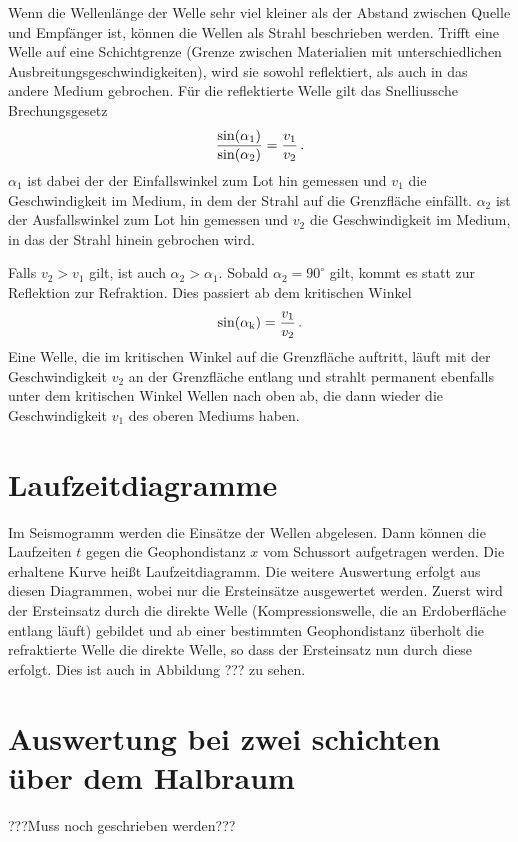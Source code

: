 Wenn die Wellenlänge der Welle sehr viel kleiner als der Abstand zwischen Quelle und Empfänger ist, können die Wellen als Strahl beschrieben werden. Trifft eine Welle auf eine Schichtgrenze (Grenze zwischen Materialien mit unterschiedlichen Ausbreitungsgeschwindigkeiten), wird sie sowohl reflektiert, als auch in das andere Medium gebrochen. Für die reflektierte Welle gilt das Snelliussche Brechungsgesetz
\begin{equation}
 \frac{\sin(\alpha_1)}{\sin(\alpha_2)}=\frac{v_1}{v_2}\text{\,.}
\end{equation}
$\alpha_1$ ist dabei der der Einfallswinkel zum Lot hin gemessen und $v_1$ die Geschwindigkeit im Medium, in dem der Strahl auf die Grenzfläche einfällt. $\alpha_2$ ist der Ausfallswinkel zum Lot hin gemessen und $v_2$ die Geschwindigkeit im Medium, in das der Strahl hinein gebrochen wird.

Falls $v_2>v_1$ gilt, ist auch $\alpha_2>\alpha_1$. Sobald $\alpha_2=90^\circ$ gilt, kommt es statt zur Reflektion zur Refraktion. Dies passiert ab dem kritischen Winkel
\begin{equation}
 \sin(\alpha_{\mathrm{k}}) =\frac{v_1}{v_2} \text{\,.}
\end{equation}
Eine Welle, die im kritischen Winkel auf die Grenzfläche auftritt, läuft mit der Geschwindigkeit $v_2$ an der Grenzfläche entlang und strahlt permanent ebenfalls unter dem kritischen Winkel Wellen nach oben ab, die dann wieder die Geschwindigkeit $v_1$ des oberen Mediums haben.

\section{Laufzeitdiagramme}

Im Seismogramm werden die Einsätze der Wellen abgelesen. Dann können die Laufzeiten $t$ gegen die Geophondistanz $x$ vom Schussort aufgetragen werden. Die erhaltene Kurve heißt Laufzeitdiagramm. Die weitere Auswertung erfolgt aus diesen Diagrammen, wobei nur die Ersteinsätze ausgewertet werden. Zuerst wird der Ersteinsatz durch die direkte Welle (Kompressionswelle, die an Erdoberfläche entlang läuft) gebildet und ab einer bestimmten Geophondistanz überholt die refraktierte Welle die direkte Welle, so dass der Ersteinsatz nun durch diese erfolgt. Dies ist auch in Abbildung ??? zu sehen.

\section{Auswertung bei zwei schichten über dem Halbraum}
???Muss noch geschrieben werden???


